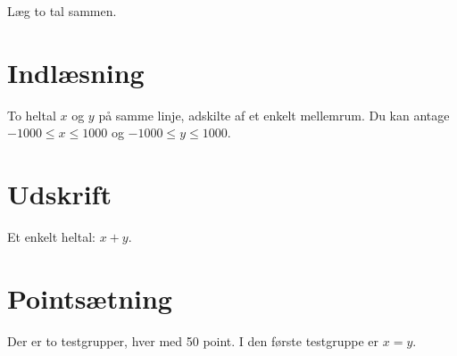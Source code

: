 
Læg to tal sammen.

\section*{Indlæsning}

To heltal $x$ og $y$ på samme linje, adskilte af et enkelt mellemrum.
Du kan antage $-1000\leq x \leq 1000$ og
$-1000\leq y \leq 1000$.

\section*{Udskrift}

Et enkelt heltal: $x+y$.

\section*{Pointsætning}

Der er to testgrupper, hver med 50 point.
I den første testgruppe er $x=y$.
